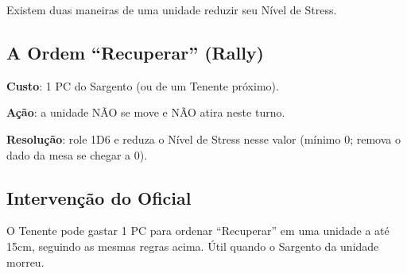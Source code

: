 Existem duas maneiras de uma unidade reduzir seu Nível de Stress.

\subsection{A Ordem ``Recuperar'' (Rally)}

\textbf{Custo}: 1 PC do Sargento (ou de um Tenente próximo).

\textbf{Ação}: a unidade NÃO se move e NÃO atira neste turno.

\textbf{Resolução}: role 1D6 e reduza o Nível de Stress nesse valor (mínimo 0; remova o dado da mesa se chegar a 0).

\subsection{Intervenção do Oficial}

O Tenente pode gastar 1 PC para ordenar ``Recuperar'' em uma unidade a até 15cm, seguindo as mesmas regras acima. Útil quando o Sargento da unidade morreu.

